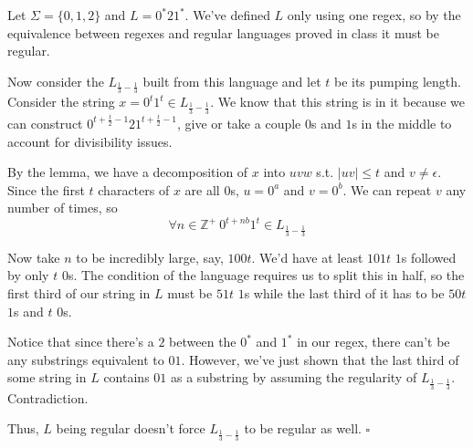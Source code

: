 \documentclass[12pt]{article}
\begin{document}
Let $\Sigma=\{0, 1, 2\}$ and $L=0^* 2 1^*$.
We've defined $L$ only using one regex, so by the equivalence between
regexes and regular languages proved in class it must be regular.

Now consider the $L_{\frac{1}{3}-\frac{1}{3}}$ built from this language and
let $t$ be its pumping length.
Consider the string $x=0^t 1^t \in L_{\frac{1}{3}-\frac{1}{3}}$.
We know that this string is in it because we can construct
$0^{t+\frac{t}{2}-1} 2 1^{t+\frac{t}{2}-1}$, give or take a couple
$0$s and $1$s in the middle to account for divisibility issues.

By the lemma, we have a decomposition of $x$ into $uvw$ s.t. $|uv| \le t$ and $v \ne \epsilon$.
Since the first $t$ characters of $x$ are all $0$s, $u=0^a$ and $v=0^b$.
We can repeat $v$ any number of times, so
\[\forall n \in \mathbb{Z}^+\ 0^{t+nb}1^t \in L_{\frac{1}{3}-\frac{1}{3}}\]

Now take $n$ to be incredibly large, say, $100t$.
We'd have at least $101t$ $1$s followed by only $t$ $0$s.
The condition of the language requires us to split this in half,
so the first third of our string in $L$ must be $51t$ $1$s
while the last third of it has to be $50t$ $1$s and $t$ $0$s.

Notice that since there's a $2$ between the $0^*$ and $1^*$ in our regex,
there can't be any substrings equivalent to $01$.
However, we've just shown that the last third of some string in $L$
contains $01$ as a substring by assuming the regularity of $L_{\frac{1}{3}-\frac{1}{3}}$.
Contradiction.

Thus, $L$ being regular doesn't force $L_{\frac{1}{3}-\frac{1}{3}}$ to be regular as well. $\square$
\end{document}

